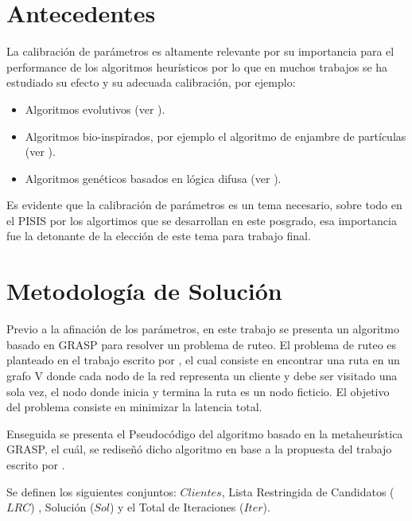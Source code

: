 \documentclass[review]{elsarticle}
\begin{document}
\section{Antecedentes}

La calibración de parámetros es altamente relevante por su importancia para el performance de los algoritmos heurísticos por lo que en muchos trabajos se ha estudiado su efecto y su adecuada calibración, por ejemplo:

\begin{itemize}
\item Algoritmos evolutivos (ver \cite{afinacionEvolutivo}).
\item Algoritmos bio-inspirados, por ejemplo el algoritmo de enjambre de partículas (ver \cite{afinacionEnjambre}).
\item Algoritmos genéticos basados en lógica difusa (ver \cite{afinacionLogicaDifusa}).
\end{itemize}

Es evidente que la calibración de parámetros es un tema necesario, sobre todo en el PISIS por los algortimos que se desarrollan en este posgrado, esa importancia fue la detonante de la elección de este tema para trabajo final. 

\section{Metodolog\'ia de Soluci\'on}
Previo a la afinaci\'on de los par\'ametros, en este trabajo se presenta un algoritmo basado en GRASP para resolver un problema de ruteo. El problema de ruteo es planteado en el trabajo escrito por \cite{angelbello2013}, el cual consiste en encontrar una ruta en un grafo V donde cada nodo de la red representa un cliente y debe ser visitado una sola vez, el nodo donde inicia y termina la ruta es un nodo ficticio. El objetivo del problema consiste en minimizar la latencia total.

Enseguida se presenta el Pseudoc\'odigo  del algoritmo basado en la metaheur\'istica GRASP, el cuál, se rediseñó dicho algoritmo en base a la propuesta  del trabajo escrito por \cite{angelbello2013}.

Se definen los siguientes conjuntos: $ Clientes$, Lista Restringida de Candidatos ($LRC$) ,  Solución ($Sol$) y el Total de Iteraciones ($Iter$).
\end{document}
